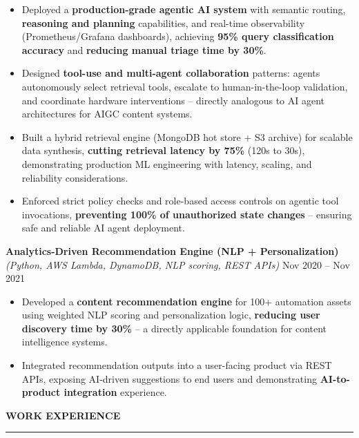 \documentclass[letterpaper,10.5pt]{extarticle}
\newcommand{\resumesection}[1]{%
    \vspace{6pt}%
    \noindent\textbf{#1}\vspace{-5pt}%
    \\\noindent\rule{\textwidth}{0.5pt}%
    \vspace{1pt}%
}
\begin{document}
\begin{itemize}[leftmargin=12pt, topsep=1pt, itemsep=0pt, parsep=0pt]
    \item Deployed a \textbf{production-grade agentic AI system} with semantic routing, \textbf{reasoning and planning} capabilities, and real-time observability (Prometheus/Grafana dashboards), achieving \textbf{95\% query classification accuracy} and \textbf{reducing manual triage time by 30\%}.
    \item Designed \textbf{tool-use and multi-agent collaboration} patterns: agents autonomously select retrieval tools, escalate to human-in-the-loop validation, and coordinate hardware interventions -- directly analogous to AI agent architectures for AIGC content systems.
    \item Built a hybrid retrieval engine (MongoDB hot store + S3 archive) for scalable data synthesis, \textbf{cutting retrieval latency by 75\%} (120s to 30s), demonstrating production ML engineering with latency, scaling, and reliability considerations.
    \item Enforced strict policy checks and role-based access controls on agentic tool invocations, \textbf{preventing 100\% of unauthorized state changes} -- ensuring safe and reliable AI agent deployment.
\end{itemize}

\vspace{4pt}

\noindent\textbf{Analytics-Driven Recommendation Engine (NLP + Personalization)}\\
\textit{(Python, AWS Lambda, DynamoDB, NLP scoring, REST APIs)} \hfill Nov 2020 -- Nov 2021

\begin{itemize}[leftmargin=12pt, topsep=1pt, itemsep=0pt, parsep=0pt]
    \item Developed a \textbf{content recommendation engine} for 100+ automation assets using weighted NLP scoring and personalization logic, \textbf{reducing user discovery time by 30\%} -- a directly applicable foundation for content intelligence systems.
    \item Integrated recommendation outputs into a user-facing product via REST APIs, exposing AI-driven suggestions to end users and demonstrating \textbf{AI-to-product integration} experience.
\end{itemize}

\resumesection{WORK EXPERIENCE}
\end{document}
